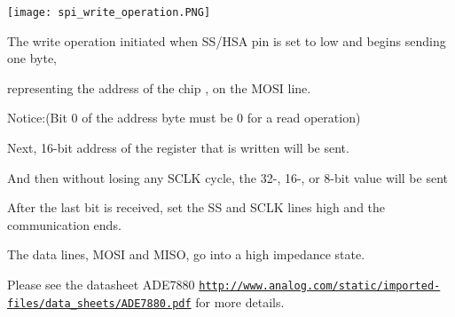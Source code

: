 \begin{DoxyImageNoCaption}
  \mbox{\texttt{[image: spi\_write\_operation.PNG]}}
\end{DoxyImageNoCaption}


\begin{DoxyItemize}
\item The write operation initiated when S\-S/\-H\-S\-A pin is set to low and begins sending one byte, \par
 representing the address of the chip , on the M\-O\-S\-I line. \par
 Notice\-:(\-Bit 0 of the address byte must be 0 for a read operation) \par
\end{DoxyItemize}
\begin{DoxyItemize}
\item Next, 16-\/bit address of the register that is written will be sent. \par
\end{DoxyItemize}
\begin{DoxyItemize}
\item And then without losing any S\-C\-L\-K cycle, the 32-\/, 16-\/, or 8-\/bit value will be sent \par
\end{DoxyItemize}
\begin{DoxyItemize}
\item After the last bit is received, set the S\-S and S\-C\-L\-K lines high and the communication ends. \par
\end{DoxyItemize}
\begin{DoxyItemize}
\item The data lines, M\-O\-S\-I and M\-I\-S\-O, go into a high impedance state. \par
 \par
\end{DoxyItemize}
Please see the datasheet A\-D\-E7880 \href{http://www.analog.com/static/imported-files/data_sheets/ADE7880.pdf}{\tt http\-://www.\-analog.\-com/static/imported-\/files/data\-\_\-sheets/\-A\-D\-E7880.\-pdf} for more details. 

